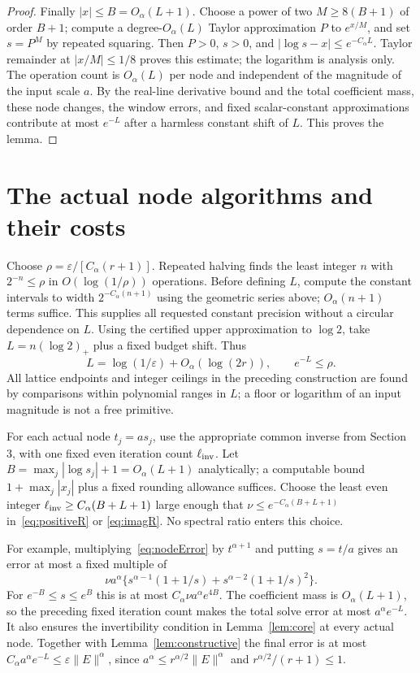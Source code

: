 \documentclass[11pt]{article}
\numberwithin{equation}{section}
\begin{document}
\begin{proof}
Finally $|x|\le B=O_\alpha(L+1)$. Choose a power of two $M\ge8(B+1)$
of order $B+1$; compute a degree-$O_\alpha(L)$ Taylor approximation
$P$ to $e^{x/M}$, and set $s=P^M$ by repeated squaring. Then $P>0$,
$s>0$, and $|\log s-x|\le e^{-C_\alpha L}$. Taylor remainder at
$|x/M|\le1/8$ proves this estimate; the logarithm is analysis only.
The operation count is $O_\alpha(L)$ per node and independent of the
magnitude of the input scale $a$. By the real-line derivative bound
and the total coefficient mass, these node changes, the window errors,
and fixed scalar-constant approximations contribute at most $e^{-L}$
after a harmless constant shift of $L$. This proves the lemma.
\end{proof}

\section{The actual node algorithms and their costs}

Choose $\rho=\varepsilon/[C_\alpha(r+1)]$. Repeated halving finds the
least integer $n$ with $2^{-n}\le\rho$ in $O(\log(1/\rho))$ operations.
Before defining $L$, compute the constant intervals to width
$2^{-C_\alpha(n+1)}$ using the geometric series above; $O_\alpha(n+1)$
terms suffice. This supplies all requested constant precision without
a circular dependence on $L$.
Using the certified upper approximation to $\log2$, take
$L=n(\log2)_+$ plus a fixed budget shift. Thus
\begin{equation}\label{eq:Lscale}
 L=\log(1/\varepsilon)+O_\alpha(\log(2r)),\qquad e^{-L}\le\rho.
\end{equation}
All lattice endpoints and integer ceilings in the preceding construction
are found by comparisons within polynomial ranges in $L$; a floor or
logarithm of an input magnitude is not a free primitive.

For each actual node $t_j=as_j$, use the appropriate common inverse
from Section 3, with one fixed even iteration count $\ell_{\rm inv}$.
Let $B=\max_j|\log s_j|+1=O_\alpha(L+1)$ analytically; a computable
bound $1+\max_j|x_j|$ plus a fixed rounding allowance suffices. Choose
the least even integer $\ell_{\rm inv}\ge C_\alpha(B+L+1)$ large enough that
$\nu\le e^{-C_\alpha(B+L+1)}$ in~\eqref{eq:positiveR} or
\eqref{eq:imagR}. No spectral ratio enters this choice.

For example, multiplying~\eqref{eq:nodeError} by $t^{\alpha+1}$ and
putting $s=t/a$ gives an error at most a fixed multiple of
\[
 \nu a^\alpha\{s^{\alpha-1}(1+1/s)
                         +s^{\alpha-2}(1+1/s)^2\}.
\]
For $e^{-B}\le s\le e^B$ this is at most
$C_\alpha\nu a^\alpha e^{4B}$. The coefficient mass is
$O_\alpha(L+1)$, so the preceding fixed iteration count makes the
total solve error at most $a^\alpha e^{-L}$. It also ensures the
invertibility condition in Lemma~\ref{lem:core} at every actual node.
Together with Lemma~\ref{lem:constructive} the final error is at most
$C_\alpha a^\alpha e^{-L}\le\varepsilon\|E\|^\alpha$, since
$a^\alpha\le r^{\alpha/2}\|E\|^\alpha$ and
$r^{\alpha/2}/(r+1)\le1$.
\end{document}

